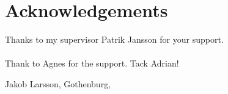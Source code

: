 \thispagestyle{plain}     %
\section*{Acknowledgements}
Thanks to my supervisor Patrik Jansson for your support.
\\
\\
Thank to Agnes for the support.
Tack Adrian!

\vspace{1.5cm}
\hfill
Jakob Larsson, Gothenburg, \monthname \space \the\year

\newpage        %
\thispagestyle{empty}
\mbox{}
